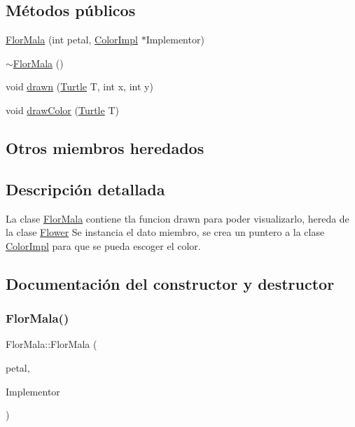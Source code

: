 \subsection*{Métodos públicos}
\begin{DoxyCompactItemize}
\item 
\hyperlink{classFlorMala_ac504cd55dfa97170f1e2abfbf29ecea7}{Flor\+Mala} (int petal, \hyperlink{classColorImpl}{Color\+Impl} $\ast$Implementor)
\item 
\hyperlink{classFlorMala_ae85e1a4162127aad42b44d6609e5ce3f}{$\sim$\+Flor\+Mala} ()
\item 
void \hyperlink{classFlorMala_aee0f20f3aa80d9ce3cb9c6fdbf036a7c}{drawn} (\hyperlink{classTurtle}{Turtle} T, int x, int y)
\item 
void \hyperlink{classFlorMala_a23657c9a53aa5823c03c688d52d56e21}{draw\+Color} (\hyperlink{classTurtle}{Turtle} T)
\end{DoxyCompactItemize}
\subsection*{Otros miembros heredados}


\subsection{Descripción detallada}
La clase \hyperlink{classFlorMala}{Flor\+Mala} contiene tla funcion drawn para poder visualizarlo, hereda de la clase \hyperlink{classFlower}{Flower}  Se instancia el dato miembro, se crea un puntero a la clase \hyperlink{classColorImpl}{Color\+Impl} para que se pueda escoger el color. 

\subsection{Documentación del constructor y destructor}
\mbox{\label{classFlorMala_ac504cd55dfa97170f1e2abfbf29ecea7}} 
\subsubsection{\texorpdfstring{Flor\+Mala()}{FlorMala()}}
{\footnotesize\ttfamily Flor\+Mala\+::\+Flor\+Mala (\begin{DoxyParamCaption}\item[{int}]{petal,  }\item[{\hyperlink{classColorImpl}{Color\+Impl} $\ast$}]{Implementor }\end{DoxyParamCaption})}

